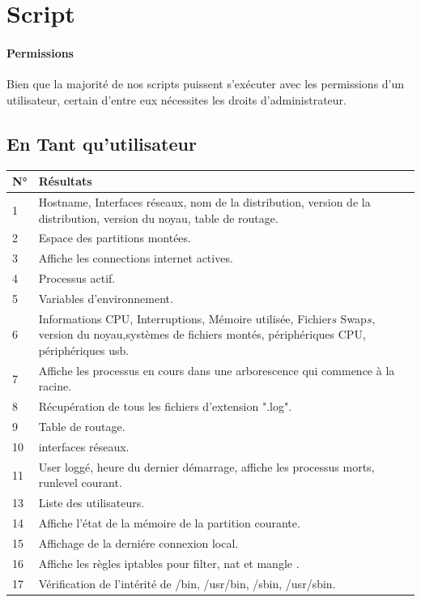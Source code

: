 \documentclass[11pt,a4paper,titlepage, oneside]{article}
\begin{document}
\newpage
\section{{\color{red} Script }}
	\paragraph{Permissions}
		Bien que la majorité de nos scripts puissent s'exécuter avec les permissions d'un utilisateur, certain d'entre eux nécessites les droits d'administrateur.\\
	\subsection{{\color{blue}En Tant qu'utilisateur}}
		\begin{tabular}{|l|p{12cm}|}
			\hline
				\textbf{N°}&\textbf{Résultats}\\
			\hline
				1 & Hostname, Interfaces réseaux, nom de la distribution, version de la distribution, version du noyau, table de routage.\\
			\hline
				2 & Espace des partitions montées.\\
			\hline
				3 & Affiche les connections internet actives.\\
			\hline
				4 & Processus actif.\\
			\hline
				5 & Variables d'environnement.\\
			\hline
				6 & Informations CPU, Interruptions, Mémoire utilisée, Fichier\(s\) Swap\(s\), version du noyau,systèmes de fichiers montés, périphériques CPU, périphériques usb.\\
			\hline
				7 & Affiche les processus en cours dans une arborescence qui commence à la racine.\\
			\hline
				8 & Récupération de tous les fichiers d'extension ".log".\\
			\hline
				9 & Table de routage.\\
			\hline
				10 & interfaces réseaux.\\
			\hline
				11 & User loggé, heure du dernier démarrage, affiche les processus morts, runlevel courant.\\
			\hline
				13 & Liste des utilisateurs.\\
			\hline
				14 & Affiche l'état de la mémoire de la partition courante.\\
			\hline
				15 & Affichage de la derniére connexion local.\\
			\hline
				16 & Affiche les règles iptables pour filter, nat et mangle .\\
			\hline
				17 & Vérification de l'intérité de /bin, /usr/bin, /sbin, /usr/sbin.\\
			\hline
		\end{tabular}
			
\end{document}
